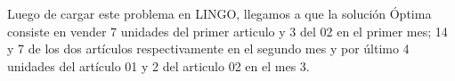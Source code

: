 
\begin{homeworkProblem}[-1][MKJ]
Luego de cargar este problema en LINGO, llegamos a que la solución Óptima consiste en vender 7 unidades del primer articulo y 3 del 02 en el primer mes; 14 y 7 de los dos artículos respectivamente en el segundo mes y por último 4 unidades del artículo 01 y 2 del articulo 02 en el mes 3.
\end{homeworkProblem}


